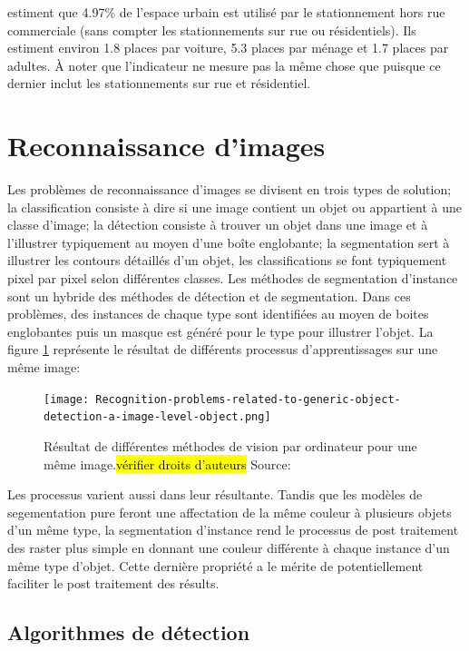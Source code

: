 \textcite{Davis:EstimatingParking:2010} estiment que 4.97\% de l'espace urbain est utilisé par le stationnement hors rue commerciale (sans compter les stationnements sur rue ou résidentiels). Ils estiment environ 1.8 places par voiture, 5.3 places par ménage et 1.7 places par adultes. À noter que l'indicateur ne mesure pas la même chose que \textcite{Chester:ParkingInfrastructure:2015} puisque ce dernier inclut les stationnements sur rue et résidentiel.

\section{Reconnaissance d'images}
Les problèmes de reconnaissance d'images se divisent en trois types de solution; la classification consiste à dire si une image contient un objet ou appartient à une classe d'image; la détection consiste à trouver un objet dans une image et à l'illustrer typiquement au moyen d'une boîte englobante; la segmentation sert à illustrer les contours détaillés d'un objet, les classifications se font typiquement pixel par pixel selon différentes classes. Les méthodes de segmentation d'instance sont un hybride des méthodes de détection et de segmentation. Dans ces problèmes, des instances de chaque type sont identifiées au moyen de boites englobantes puis un masque est généré pour le type pour illustrer l'objet. La figure \ref{fig:computer_vision_problems} représente le résultat de différents processus d'apprentissages sur une même image:

\begin{figure}
  \centering
  \texttt{[image: Recognition-problems-related-to-generic-object-detection-a-image-level-object.png]}
  \caption{Résultat de différentes méthodes de vision par ordinateur pour une même image.\hl{vérifier droits d'auteurs} Source: \cite{Minaee:ImageSegmentation:2022}}
  \label{fig:computer_vision_problems}
\end{figure}
Les processus varient aussi dans leur résultante. Tandis que les modèles de segementation pure feront une affectation de la même couleur à plusieurs objets d'un même type, la segmentation d'instance rend le processus de post traitement des raster plus simple en donnant une couleur différente à chaque instance d'un même type d'objet. Cette dernière propriété a le mérite de potentiellement faciliter le post traitement des résults.
\FloatBarrier
\subsection{Algorithmes de détection}

